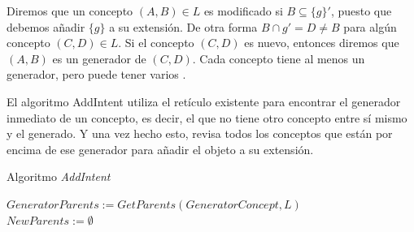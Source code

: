 \documentclass[oneside,openright,titlepage,numbers=noenddot,openany,headinclude,footinclude=true,
cleardoublepage=empty,abstractoff,BCOR=5mm,paper=a4,fontsize=12pt,main=spanish]{scrreprt}
\begin{document}
Diremos que un concepto $(A,B) \in L$ es modificado si $B\subseteq \{g\}'$, puesto que debemos añadir $\{g\}$ a su extensión. De otra forma $B \cap g'=D\neq B$ para algún concepto $(C,D) \in L$. Si el concepto $(C,D)$ es nuevo, entonces diremos que $(A,B)$ es un generador de $(C,D)$. Cada concepto tiene al menos un generador, pero puede tener varios \cite{addintentprofundizar}. 

El algoritmo AddIntent utiliza el retículo existente para encontrar el generador inmediato de un concepto, es decir, el que no tiene otro concepto entre sí mismo y el generado. Y una vez hecho esto, revisa todos los conceptos que están por encima de ese generador para añadir el objeto a su extensión. 

\begin{algorithm}[H]
\caption{Algoritmo \textit{AddIntent}}
\label{code:addintent}
     
    
    $GeneratorParents := GetParents(GeneratorConcept,L)$\\
    $NewParents:=\emptyset$\\
    
    
\end{algorithm}
\end{document}
